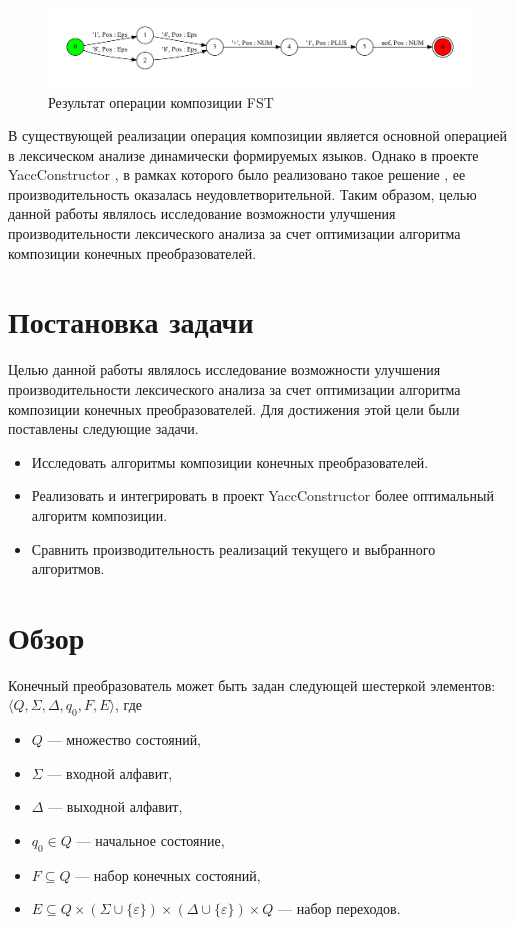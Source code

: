 \documentclass[14pt]{matmex-diploma}
\begin{document}
\begin{figure}[h]
\centering
\includegraphics[width=16cm]{pictures/res.pdf}
\caption{Результат операции композиции FST}
\label{результат_композиции}
\end{figure}

В существующей реализации операция композиции является основной операцией в лексическом анализе динамически формируемых языков. Однако в проекте YaccConstructor \cite{yacc_article,yacc_www}, в рамках которого было реализовано такое решение \cite{polubelova}, ее производительность оказалась неудовлетворительной. Таким образом, целью данной работы являлось исследование возможности улучшения производительности лексического анализа за счет оптимизации алгоритма композиции конечных преобразователей.

\section{Постановка задачи}
Целью данной работы являлось исследование возможности улучшения производительности лексического анализа за счет оптимизации алгоритма композиции конечных преобразователей. Для достижения этой цели были поставлены следующие задачи.

\begin{itemize}
\item Исследовать алгоритмы композиции конечных преобразователей.
\item Реализовать и интегрировать в проект YaccConstructor более оптимальный алгоритм композиции.
\item Сравнить производительность реализаций текущего и выбранного алгоритмов.
\end{itemize} 

\section{Обзор}
Конечный преобразователь может быть задан следующей шестеркой элементов: $\langle Q, \Sigma, \Delta, q_0, F, E \rangle$, где

\begin{itemize}
\item $Q$ — множество состояний, 
\item $\Sigma$ — входной алфавит, 
\item $\Delta$ — выходной алфавит, 
\item $q_0 \in Q$ — начальное состояние, 
\item $F \subseteq Q$ — набор конечных состояний, 
\item $E \subseteq Q \times (\Sigma \cup \{\varepsilon\}) \times (\Delta \cup \{\varepsilon\})  \times Q$ — набор переходов. 
\end{itemize}
\end{document}
